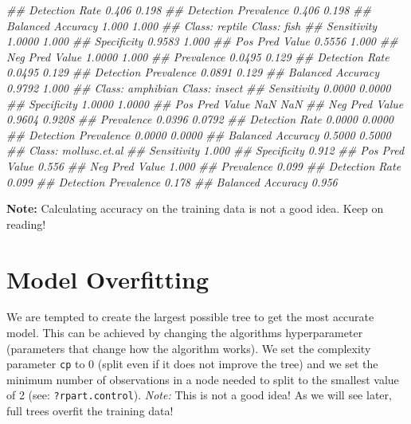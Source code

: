 \documentclass[
  notitlepage]{book}
\newenvironment{Shaded}{\begin{snugshade}}{\end{snugshade}}
\newcommand{\CommentTok}[1]{\textcolor[rgb]{0.56,0.35,0.01}{\textit{#1}}}
\begin{document}
\begin{Shaded}
\begin{Highlighting}[]
\CommentTok{\#\# Detection Rate               0.406       0.198}
\CommentTok{\#\# Detection Prevalence         0.406       0.198}
\CommentTok{\#\# Balanced Accuracy            1.000       1.000}
\CommentTok{\#\#                      Class: reptile Class: fish}
\CommentTok{\#\# Sensitivity                  1.0000       1.000}
\CommentTok{\#\# Specificity                  0.9583       1.000}
\CommentTok{\#\# Pos Pred Value               0.5556       1.000}
\CommentTok{\#\# Neg Pred Value               1.0000       1.000}
\CommentTok{\#\# Prevalence                   0.0495       0.129}
\CommentTok{\#\# Detection Rate               0.0495       0.129}
\CommentTok{\#\# Detection Prevalence         0.0891       0.129}
\CommentTok{\#\# Balanced Accuracy            0.9792       1.000}
\CommentTok{\#\#                      Class: amphibian Class: insect}
\CommentTok{\#\# Sensitivity                    0.0000        0.0000}
\CommentTok{\#\# Specificity                    1.0000        1.0000}
\CommentTok{\#\# Pos Pred Value                    NaN           NaN}
\CommentTok{\#\# Neg Pred Value                 0.9604        0.9208}
\CommentTok{\#\# Prevalence                     0.0396        0.0792}
\CommentTok{\#\# Detection Rate                 0.0000        0.0000}
\CommentTok{\#\# Detection Prevalence           0.0000        0.0000}
\CommentTok{\#\# Balanced Accuracy              0.5000        0.5000}
\CommentTok{\#\#                      Class: mollusc.et.al}
\CommentTok{\#\# Sensitivity                         1.000}
\CommentTok{\#\# Specificity                         0.912}
\CommentTok{\#\# Pos Pred Value                      0.556}
\CommentTok{\#\# Neg Pred Value                      1.000}
\CommentTok{\#\# Prevalence                          0.099}
\CommentTok{\#\# Detection Rate                      0.099}
\CommentTok{\#\# Detection Prevalence                0.178}
\CommentTok{\#\# Balanced Accuracy                   0.956}
\end{Highlighting}
\end{Shaded}

\textbf{Note:} Calculating accuracy on the training data is not a good idea.
Keep on reading!

\hypertarget{model-overfitting}{%
\section{Model Overfitting}\label{model-overfitting}}

We are tempted to create the largest possible tree
to get the most accurate model. This can be achieved by
changing the algorithms hyperparameter (parameters that
change how the algorithm works). We
set the complexity parameter \texttt{cp} to 0 (split
even if it does not improve the tree) and we set the minimum number of
observations in a node needed to split to the smallest value of 2 (see:
\texttt{?rpart.control}). \emph{Note:} This is not a good idea!
As we will see later, full trees overfit the training data!
\end{document}
